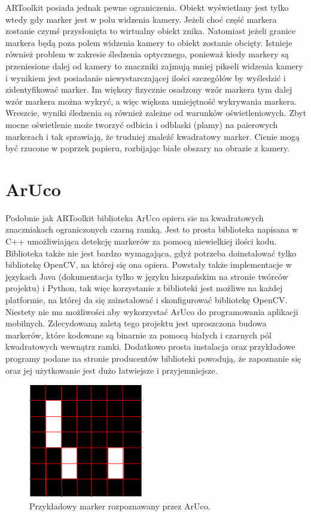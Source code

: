 ARToolkit posiada jednak pewne ograniczenia. Obiekt wyświetlany jest tylko wtedy gdy marker jest w polu widzenia kamery. Jeżeli choć część markera zostanie czymś przysłonięta to wirtualny obiekt znika. Natomiast jeżeli granice markera będą poza polem widzenia kamery to obiekt zostanie obcięty. Istnieje również problem w zakresie śledzenia optycznego, ponieważ kiedy markery są przeniesione dalej od kamery to znaczniki zajmują mniej pikseli widzenia kamery i wynikiem jest posiadanie niewystarczającej ilości szczegółów by wyśledzić i zidentyfikować marker. Im większy fizycznie osadzony wzór markera tym dalej wzór markera można wykryć, a więc większa umiejętność wykrywania markera. Wreszcie, wyniki śledzenia są również zależne od warunków oświetleniowych. Zbyt mocne oświetlenie może tworzyć odbicia i odblaski (plamy) na paierowych markerach i tak sprawiają, że trudniej znaleźć kwadratowy marker. Cienie mogą być rzucone w poprzek papieru, rozbijając białe obszary na obrazie z kamery.


\section{ArUco}
\label{sec:aruco}

Podobnie jak ARToolkit biblioteka ArUco opiera sie na kwadratowych znaczniakach ograniczonych czarną ramką. Jest to prosta biblioteka napisana w C++ umożliwiająca detekcję markerów za pomocą niewielkiej ilości kodu. Biblioteka także nie jest bardzo wymagająca, gdyż potrzeba doinstalować tylko bibliotekę OpenCV, na której się ona opiera. Powstały także implementacje w językach Java (dokumentacja tylko w języku hiszpańskim na stronie twórców projektu) i Python, tak więc korzystanie z biblioteki jest możliwe na każdej platformie, na której da się zainstalować i skonfigurować bibliotekę OpenCV. Niestety nie ma możliwości aby wykorzystać ArUco do programowania aplikacji mobilnych. Zdecydowaną zaletą tego projektu jest uproszczona budowa markerów, które kodowane są binarnie za pomocą białych i czarnych pól kwadratowych wewnątrz ramki. Dodatkowo prosta instalacja oraz przykładowe programy podane na stronie producentów biblioteki \cite{ArUco} powodują, że zapoznanie się oraz jej użytkowanie jest dużo łatwiejsze i przyjemniejsze.
\bigskip

\begin{figure}[ht!]
\centering
\includegraphics[width=50mm]{aruco-marker.png}
\caption{Przykładowy marker rozpoznawany przez ArUco. \label{arucoMarker}}
\end{figure}

